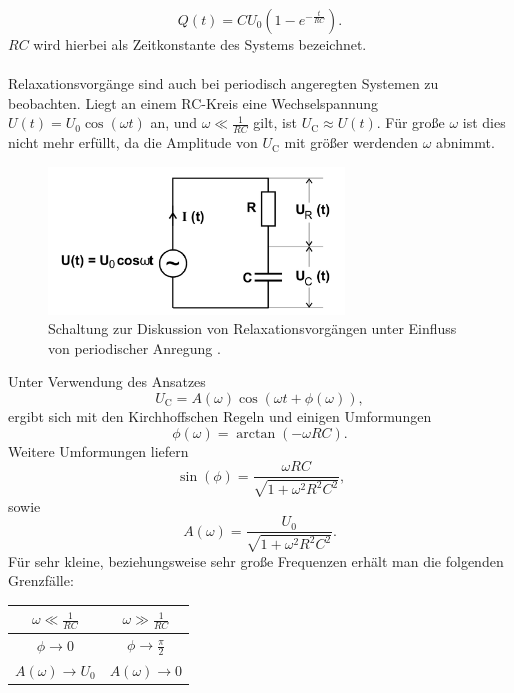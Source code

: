 \begin{equation}
	\label{eqn:entladung}
	Q(t)=CU_\text{0}(  1-e^{-\frac{t}{RC}} ) .
\end{equation}
$RC$ wird hierbei als Zeitkonstante des Systems bezeichnet.\\
\\Relaxationsvorgänge sind auch bei periodisch angeregten Systemen zu beobachten.
Liegt an einem RC-Kreis eine Wechselspannung $U(t)=U_\text{0}\cos(\omega t)$ an, und $\omega \ll \frac{1}{RC}$ gilt, ist $U_\text{C} \approx U(t)$.
Für große $\omega$ ist dies nicht mehr erfüllt, da die Amplitude von $U_\text{C}$ mit größer werdenden $\omega$ abnimmt.
\begin{figure}
	\centering
	\includegraphics[width=0.7\textwidth]{bilder/periodisch.png}
	\caption{Schaltung zur Diskussion von Relaxationsvorgängen unter Einfluss von periodischer Anregung \cite{Anleitung}.}
	\label{fig:periodisch}
\end{figure}
Unter Verwendung des Ansatzes
\begin{equation*}
	U_\text{C}=A(\omega)\cos(\omega t +\phi(\omega)) ,
\end{equation*}
ergibt sich mit den Kirchhoffschen Regeln und einigen Umformungen
\begin{equation}
	\label{eqn:phase}
	\phi(\omega)=\arctan(-\omega RC) \text{.}
\end{equation}
Weitere Umformungen liefern
\begin{equation}
	\label{eqn:sinphase}
	\sin(\phi)=\frac{\omega RC}{\sqrt{1+\omega ^2R^2C^2}} \text{,}
\end{equation}
sowie
\begin{equation}
	\label{eqn:amplitude}
	A(\omega)=\frac{U_\text{0}}{\sqrt{1+\omega ^2R^2C^2}} .
\end{equation}
Für sehr kleine, beziehungsweise sehr große Frequenzen erhält man die folgenden Grenzfälle:

\begin{table}
	\centering
	\label{tab:tab1}
	\begin{tabular}{cc}
		\toprule
		$\omega \ll \frac{1}{RC} $  & $ \omega \gg \frac{1}{RC}$ \\
		\midrule
		$\phi \to 0$                & $\phi \to \frac{\pi}{2}$   \\
		$A(\omega) \to U_\text{0} $ & $A(\omega) \to 0$          \\
		\bottomrule
	\end{tabular}
\end{table}

